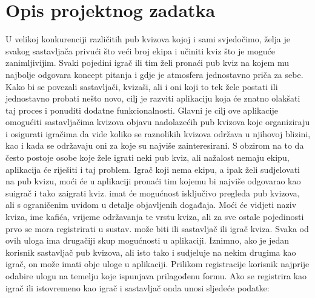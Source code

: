 \chapter{Opis projektnog zadatka}
		
		U velikoj konkurenciji različitih pub kvizova kojoj i sami svjedočimo, želja je svakog sastavljača privući što veći broj ekipa i učiniti kviz što je moguće zanimljivijim. Svaki pojedini igrač ili tim želi pronaći pub kviz na kojem mu najbolje odgovara koncept pitanja i gdje je atmosfera jednostavno priča za sebe. Kako bi se povezali sastavljači, kvizaši, ali i oni koji to tek žele postati ili jednostavno probati nešto novo, cilj je razviti aplikaciju koja će znatno olakšati taj proces i ponuditi dodatne funkcionalnosti.
		\newline \newline
		Glavni je cilj ove aplikacije omogućiti sastavljačima kvizova objavu nadolazećih pub kvizova koje organiziraju i osigurati igračima da vide koliko se raznolikih kvizova održava u njihovoj blizini, kao i kada se održavaju oni za koje su najviše zainteresirani. S obzirom na to da često postoje osobe koje žele igrati neki pub kviz, ali nažalost nemaju ekipu, aplikacija će riješiti i taj problem. Igrač koji nema ekipu, a ipak želi sudjelovati na pub kvizu, moći će u aplikaciji pronaći tim kojemu bi najviše odgovarao kao suigrač i tako zaigrati kviz.
		\newline \newline
		 imat će mogućnost isključivo pregleda pub kvizova, ali s ograničenim uvidom u detalje objavljenih događaja. Moći će vidjeti naziv kviza, ime kafića, vrijeme održavanja te vrstu kviza, ali za sve ostale pojedinosti prvo se mora registrirati u sustav.
		\newline \newline
		 može biti ili sastavljač ili igrač kviza. Svaka od ovih uloga ima drugačiji skup mogućnosti u aplikaciji. Iznimno, ako je jedan korisnik sastavljač pub kvizova, ali isto tako i sudjeluje na nekim drugima kao igrač, on može imati obje uloge u aplikaciji. Prilikom registracije korisnik najprije odabire ulogu na temelju koje ispunjava prilagođenu formu. Ako se registrira kao igrač ili istovremeno kao igrač i sastavljač onda unosi sljedeće podatke:
